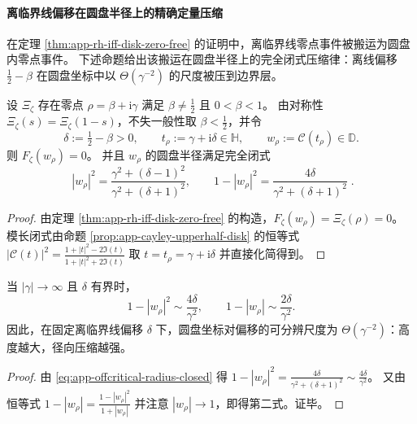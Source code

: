 

\paragraph{离临界线偏移在圆盘半径上的精确定量压缩}
在定理 \ref{thm:app-rh-iff-disk-zero-free} 的证明中，离临界线零点事件被搬运为圆盘内零点事件。
下述命题给出该搬运在圆盘半径上的完全闭式压缩律：离线偏移 \(\tfrac12-\beta\) 在圆盘坐标中以 \(\Theta(\gamma^{-2})\) 的尺度被压到边界层。

\begin{proposition}[离临界线偏移的圆盘半径闭式压缩]\label{prop:app-offcritical-radius-compression}
设 \(\Xi_{\zeta}\) 存在零点 \(\rho=\beta+\mathrm{i}\gamma\) 满足 \(\beta\neq\tfrac12\) 且 \(0<\beta<1\)。
由对称性 \(\Xi_{\zeta}(s)=\Xi_{\zeta}(1-s)\)，不失一般性取 \(\beta<\tfrac12\)，并令
\[
\delta:=\tfrac12-\beta>0,
\qquad
t_{\rho}:=\gamma+\mathrm{i}\delta\in\mathbb{H},
\qquad
w_{\rho}:=\mathcal{C}(t_{\rho})\in\mathbb{D}.
\]
则 \(F_{\zeta}(w_{\rho})=0\)。
并且 \(w_{\rho}\) 的圆盘半径满足完全闭式
\begin{equation}\label{eq:app-offcritical-radius-closed}
\boxed{\;
|w_{\rho}|^{2}
=\frac{\gamma^{2}+(\delta-1)^{2}}{\gamma^{2}+(\delta+1)^{2}},
\qquad
1-|w_{\rho}|^{2}
=\frac{4\delta}{\gamma^{2}+(\delta+1)^{2}}\; }.
\end{equation}
\end{proposition}
\begin{proof}
由定理 \ref{thm:app-rh-iff-disk-zero-free} 的构造，\(F_{\zeta}(w_{\rho})=\Xi_{\zeta}(\rho)=0\)。
模长闭式由命题 \ref{prop:app-cayley-upperhalf-disk} 的恒等式
\(
|\mathcal{C}(t)|^{2}=\frac{1+|t|^{2}-2\Im(t)}{1+|t|^{2}+2\Im(t)}
\)
取 \(t=t_{\rho}=\gamma+\mathrm{i}\delta\) 并直接化简得到。
\end{proof}

\begin{corollary}[高高度压缩尺度]\label{cor:app-offcritical-radius-high-height}
当 \(|\gamma|\to\infty\) 且 \(\delta\) 有界时，
\[
1-|w_{\rho}|^{2}\sim \frac{4\delta}{\gamma^{2}},
\qquad
1-|w_{\rho}|\sim \frac{2\delta}{\gamma^{2}}.
\]
因此，在固定离临界线偏移 \(\delta\) 下，圆盘坐标对偏移的可分辨尺度为 \(\Theta(\gamma^{-2})\)：高度越大，径向压缩越强。
\end{corollary}
\begin{proof}
由 \eqref{eq:app-offcritical-radius-closed} 得
\(
1-|w_{\rho}|^{2}=\frac{4\delta}{\gamma^{2}+(\delta+1)^{2}}
\sim \frac{4\delta}{\gamma^{2}}
\)。
又由恒等式
\(
1-|w_{\rho}|=\frac{1-|w_{\rho}|^{2}}{1+|w_{\rho}|}
\)
并注意 \(|w_{\rho}|\to 1\)，即得第二式。证毕。
\end{proof}

